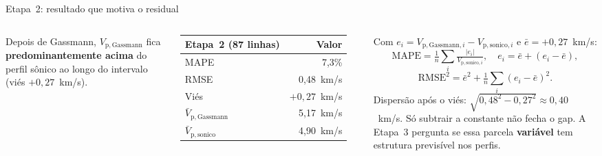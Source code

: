 \documentclass[aspectratio=169,10pt]{beamer}
\begin{document}
\begin{frame}[shrink=8]{Etapa~2: resultado que motiva o residual}
  \begin{columns}[T,onlytextwidth]
    \footnotesize
    Depois de Gassmann, $V_{\mathrm{p,Gassmann}}$ fica
    \textbf{predominantemente acima} do perfil sônico ao longo do
    intervalo (viés $+0{,}27$~km/s).
    \par
    \vspace{0.04cm}
    \centering
    \scriptsize
    \begin{tabular}{lr}
      \toprule
      Etapa~2 (87 linhas) & Valor \\
      \midrule
      MAPE \Vp{} & 7,3\% \\
      RMSE & 0,48~km/s \\
      Viés & $+0{,}27$~km/s \\
      $\bar{V}_{\mathrm{p,Gassmann}}$ & 5,17~km/s \\
      $\bar{V}_{\mathrm{p,sonico}}$ & 4,90~km/s \\
      \bottomrule
    \end{tabular}
    \par
    \vspace{0.04cm}
    \raggedright
    {\scriptsize
    Com $e_i=V_{\mathrm{p,Gassmann},i}-V_{\mathrm{p,sonico},i}$ e
    $\bar{e}=+0{,}27$~km/s:
    \[
      \mathrm{MAPE}
      =\tfrac{1}{n}\sum_i
      \tfrac{|e_i|}{V_{\mathrm{p,sonico},i}},
      \quad
      e_i = \bar{e} + (e_i-\bar{e}),
    \]
    \[
      \mathrm{RMSE}^{2}
      = \bar{e}^{2}
      + \tfrac{1}{n}\sum_i(e_i-\bar{e})^{2}.
    \]
    Dispersão após o viés:
    $\sqrt{0{,}48^{2}-0{,}27^{2}}\approx 0{,}40$~km/s.
    Só subtrair a constante não fecha o gap.
    A Etapa~3 pergunta se essa parcela \textbf{variável} tem
    estrutura previsível nos perfis.}
  \end{columns}
\end{frame}
\end{document}
